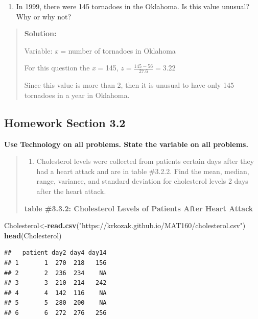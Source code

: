 \documentclass[]{book}
\newenvironment{Shaded}{\begin{snugshade}}{\end{snugshade}}
\newcommand{\KeywordTok}[1]{\textcolor[rgb]{0.13,0.29,0.53}{\textbf{#1}}}
\newcommand{\NormalTok}[1]{#1}
\newcommand{\StringTok}[1]{\textcolor[rgb]{0.31,0.60,0.02}{#1}}
\providecommand{\tightlist}{%
  \setlength{\itemsep}{0pt}\setlength{\parskip}{0pt}}
\begin{document}
\begin{enumerate}
\def\labelenumi{\alph{enumi}.}
\setcounter{enumi}{1}
\tightlist
\item
  In 1999, there were 145 tornadoes in the Oklahoma. Is this value unusual? Why or why not?
\end{enumerate}

\begin{quote}
\textbf{Solution:}

Variable: \emph{x} = number of tornadoes in Oklahoma

For this question the \emph{x} = 145, \(z=\frac{145-56}{27.6}=3.22\)

Since this value is more than 2, then it is unusual to have only 145 tornadoes in a year in Oklahoma.
\end{quote}

\hypertarget{homework-section-3.2}{%
\subsection{Homework Section 3.2}\label{homework-section-3.2}}

\textbf{Use Technology on all problems. State the variable on all problems.}

\begin{quote}
\begin{enumerate}
\def\labelenumi{\arabic{enumi}.}
\tightlist
\item
  Cholesterol levels were collected from patients certain days after they had a heart attack and are in table \#3.2.2. Find the mean, median, range, variance, and standard deviation for cholesterol levels 2 days after the heart attack.
\end{enumerate}

\textbf{table \#3.3.2: Cholesterol Levels of Patients After Heart Attack}
\end{quote}

\begin{Shaded}
\begin{Highlighting}[]
\NormalTok{Cholesterol<-}\KeywordTok{read.csv}\NormalTok{(}\StringTok{"https://krkozak.github.io/MAT160/cholesterol.csv"}\NormalTok{)}
\KeywordTok{head}\NormalTok{(Cholesterol)}
\end{Highlighting}
\end{Shaded}

\begin{verbatim}
##   patient day2 day4 day14
## 1       1  270  218   156
## 2       2  236  234    NA
## 3       3  210  214   242
## 4       4  142  116    NA
## 5       5  280  200    NA
## 6       6  272  276   256
\end{verbatim}
\end{document}
